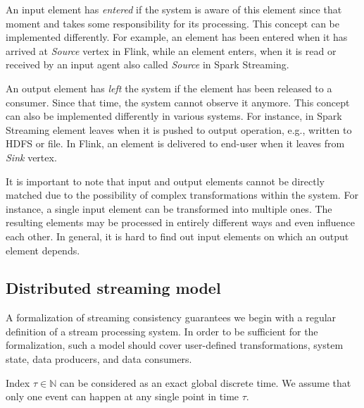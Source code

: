 An input element has {\em entered} if the system is aware of this element since that moment and takes some responsibility for its processing. 
This concept can be implemented differently. 
For example,
 an  element has been entered when  it  has arrived at {\em Source} vertex in Flink, while   
an element enters, when it is read or received by an input agent also called  {\em Source}   in Spark Streaming.

An output element has {\em left} the system if the element has been released to a consumer. 
Since that time, the system cannot observe it anymore. This concept can also be implemented differently in various systems. For instance, in Spark Streaming element leaves when it is pushed to output operation, e.g., written to HDFS or file. In Flink, an element is delivered to end-user when it leaves from {\em Sink} vertex.   

It is important to note that input and output elements cannot be directly matched due to the possibility of complex transformations within the system. 
For instance, a single input element can be transformed into multiple ones.  The resulting elements may be processed in entirely different ways and even influence each other. 
In general, it is hard to find out input elements on which an output element depends. 

\subsection{Distributed streaming model}

A formalization of streaming consistency guarantees we begin with a regular definition of a stream processing system. In order to be sufficient for the formalization, such a model should cover user-defined transformations, system state, data producers, and data consumers.

Index $\tau\in{\mathbb{N}}$ can be considered as an exact global discrete time. We assume that only one event can happen at any single point in time $\tau$.

